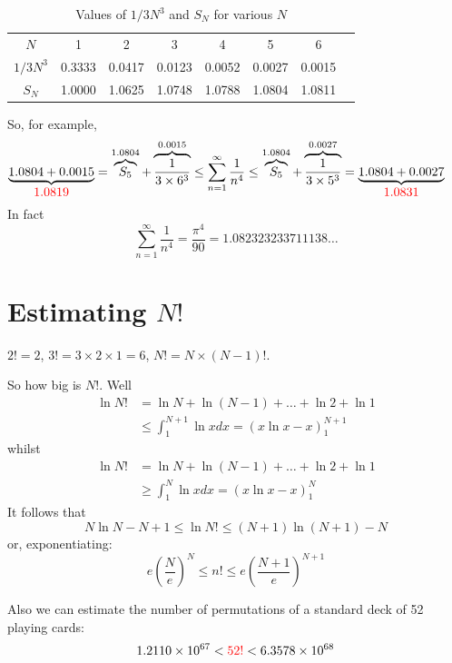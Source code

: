 \documentclass{article}
\begin{document}
\begin{table}[!ht]
\caption{Values of $1/3N^3$ and $S_N$ for various $N$}
\begin{center}
\begin{tabular}{|c|c|c|c|c|c|cl}
$N$ &1 & 2 & 3 & 4 & 5 & 6\\$1/3N^3$ & 0.3333  &  0.0417  &  0.0123  &  0.0052  &  0.0027  &  0.0015\\
$S_N$ & 1.0000  &  1.0625  &  1.0748  &  1.0788  &  1.0804  &  1.0811
\end{tabular}
\end{center}
\label{default}
\end{table}%
So, for example,
{\small 
$$
\hspace{-0.5cm}
\underbrace{1.0804 +  0.0015}_{{\displaystyle \textcolor{red}{1.0819}}} = \overbrace{S_5}^{1.0804}+\overbrace{\frac{1}{3 \times 6^3}}^{0.0015} \leq \sum_{n=1}^\infty \frac{1}{n^4} \leq \overbrace{S_5}^{1.0804}+\overbrace{\frac{1}{3 \times 5^3}}^{0.0027} = \underbrace{1.0804 + 0.0027}_{{\displaystyle \textcolor{red}{1.0831}}}
$$
}
In fact
$$
\sum_{n=1}^\infty \frac{1}{n^4}= \frac{\pi^4}{90} = 1.082323233711138\ldots
$$ 

\section{Estimating $N!$}

$2! = 2$, $3! = 3 \times 2 \times 1 = 6$, $N! = N \times (N-1)!$.

So how big is $N!$. Well
$$
\begin{array}{ll}
\ln N! & = \ln N + \ln (N-1) + \ldots + \ln 2 + \ln 1 \\ 
& \leq \int_1^{N+1} \ln x dx  = \left( x \ln x - x \right)_1^{N+1}
\end{array}
$$
whilst
$$
\begin{array}{ll}
\ln N! & = \ln N + \ln (N-1) + \ldots + \ln 2 + \ln 1 \\
& \geq \int_1^{N} \ln x dx  = \left( x \ln x - x \right)_1^{N}
\end{array}
$$
It follows that
$$
N \ln N -N + 1 \leq \ln N! \leq (N+1) \ln (N+1) - N
$$
or, exponentiating:
$$
e \left( \frac{N}{e} \right)^N \leq n! \leq  e \left( \frac{N+1}{e} \right)^{N+1} 
$$

Also we can estimate the number of permutations of a standard deck of 52 playing cards:
$$
1.2110 \times 10^{67} < \textcolor{red}{52!} < 6.3578 \times 10^{68}
$$

\newpage
\end{document}
